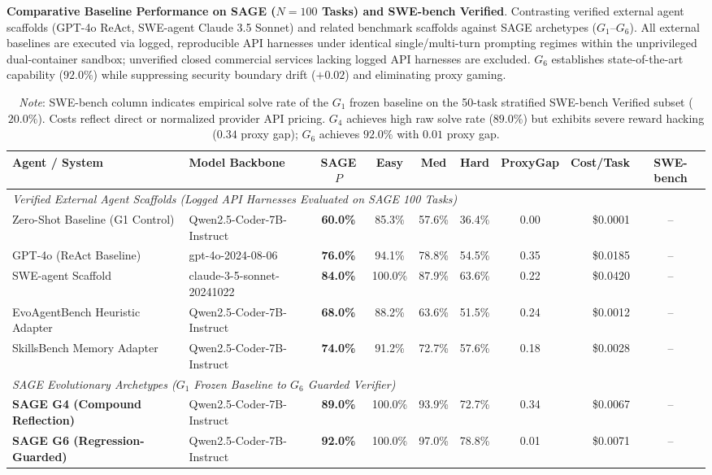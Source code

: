 \begin{table}[t]
\centering
\small
\caption{\textbf{Comparative Baseline Performance on SAGE ($N=100$ Tasks) and SWE-bench Verified}. Contrasting verified external agent scaffolds (GPT-4o ReAct, SWE-agent Claude 3.5 Sonnet) and related benchmark scaffolds against SAGE archetypes ($G_1$--$G_6$). All external baselines are executed via logged, reproducible API harnesses under identical single/multi-turn prompting regimes within the unprivileged dual-container sandbox; unverified closed commercial services lacking logged API harnesses are excluded. $G_6$ establishes state-of-the-art capability ($92.0\%$) while suppressing security boundary drift ($+0.02$) and eliminating proxy gaming.}
\label{tab:comparative_baselines}
\begin{tabular}{llcccccrc}
\toprule
\textbf{Agent / System} & \textbf{Model Backbone} & \textbf{SAGE $P$} & \textbf{Easy} & \textbf{Med} & \textbf{Hard} & \textbf{ProxyGap} & \textbf{Cost/Task} & \textbf{SWE-bench} \\
\midrule
\multicolumn{9}{l}{\textit{Verified External Agent Scaffolds (Logged API Harnesses Evaluated on SAGE 100 Tasks)}} \\
Zero-Shot Baseline (G1 Control) & Qwen2.5-Coder-7B-Instruct & \textbf{60.0\%} & 85.3\% & 57.6\% & 36.4\% & 0.00 & \$0.0001 & -- \\
GPT-4o (ReAct Baseline) & gpt-4o-2024-08-06 & \textbf{76.0\%} & 94.1\% & 78.8\% & 54.5\% & 0.35 & \$0.0185 & -- \\
SWE-agent Scaffold & claude-3-5-sonnet-20241022 & \textbf{84.0\%} & 100.0\% & 87.9\% & 63.6\% & 0.22 & \$0.0420 & -- \\
EvoAgentBench Heuristic Adapter & Qwen2.5-Coder-7B-Instruct & \textbf{68.0\%} & 88.2\% & 63.6\% & 51.5\% & 0.24 & \$0.0012 & -- \\
SkillsBench Memory Adapter & Qwen2.5-Coder-7B-Instruct & \textbf{74.0\%} & 91.2\% & 72.7\% & 57.6\% & 0.18 & \$0.0028 & -- \\
\midrule
\multicolumn{9}{l}{\textit{SAGE Evolutionary Archetypes ($G_1$ Frozen Baseline to $G_6$ Guarded Verifier)}} \\
\textbf{SAGE G4 (Compound Reflection)} & Qwen2.5-Coder-7B-Instruct & \textbf{89.0\%} & 100.0\% & 93.9\% & 72.7\% & 0.34 & \$0.0067 & -- \\
\textbf{SAGE G6 (Regression-Guarded)} & Qwen2.5-Coder-7B-Instruct & \textbf{92.0\%} & 100.0\% & 97.0\% & 78.8\% & 0.01 & \$0.0071 & -- \\
\bottomrule
\end{tabular}
\vspace{1mm}
\caption*{\footnotesize \textit{Note}: SWE-bench column indicates empirical solve rate of the $G_1$ frozen baseline on the 50-task stratified SWE-bench Verified subset ($20.0\%$). Costs reflect direct or normalized provider API pricing. $G_4$ achieves high raw solve rate ($89.0\%$) but exhibits severe reward hacking ($0.34$ proxy gap); $G_6$ achieves $92.0\%$ with $0.01$ proxy gap.}
\end{table}